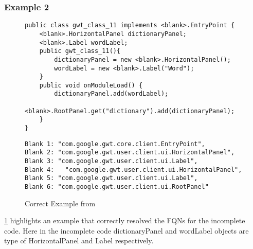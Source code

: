 \subsubsection{Example 2}

\begin{figure}[t]
	\centering
\begin{minipage}{.52\textwidth}
\begin{lstlisting}[label = left2, caption = Project: gwt class 11]
public class gwt_class_11 implements <blank>.EntryPoint {
    <blank>.HorizontalPanel dictionaryPanel;
    <blank>.Label wordLabel;
    public gwt_class_11(){
        dictionaryPanel = new <blank>.HorizontalPanel();
        wordLabel = new <blank>.Label("Word");
    }
    public void onModuleLoad() {
        dictionaryPanel.add(wordLabel);
        <blank>.RootPanel.get("dictionary").add(dictionaryPanel);
    }
}
\end{lstlisting}
\end{minipage}
\hspace{2pt}
\begin{minipage}{.46\textwidth}
\begin{lstlisting}[label = right2, caption = Ground Truth]
Blank 1: "com.google.gwt.core.client.EntryPoint",
Blank 2: "com.google.gwt.user.client.ui.HorizontalPanel", 
Blank 3: "com.google.gwt.user.client.ui.Label", 
Blank 4:   "com.google.gwt.user.client.ui.HorizontalPanel", 
Blank 5: "com.google.gwt.user.client.ui.Label", 
Blank 6: "com.google.gwt.user.client.ui.RootPanel"

\end{lstlisting}
\end{minipage}  
\vspace{-18pt}
\caption{Correct Example from {\tool}}
\label{eval:example2}
\end{figure}


{\ref{eval:example2}} highlights an example that {\tool} correctly resolved the FQNs for the incomplete code. Here  in the incomplete code dictionaryPanel and wordLabel objects are type of HorizontalPanel and Label respectively. 